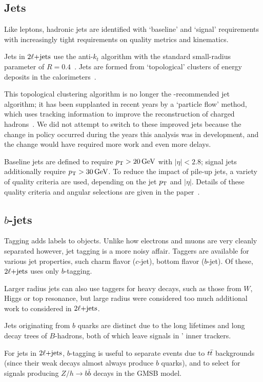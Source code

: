 \subsection{Jets}
Like leptons, hadronic jets are identified with `baseline' and `signal'
requirements with increasingly tight requirements on quality metrics and
kinematics.

Jets in $\twoljets$ use the anti-$k_t$ algorithm with the standard small-radius
parameter of $R=0.4$~\cite{jet_anti_kt}.
Jets are formed from `topological' clusters of energy deposits in the
calorimeters~\cite{atlas_jet_topo_PERF_2014_07}.

This topological clustering algorithm is no longer the \atlas-recommended jet
algorithm; it has been supplanted in recent years by a `particle flow' method,
which uses tracking information to improve the reconstruction of charged
hadrons~\cite{atlas_jet_pflow_PERF_2015_09}.
We did not attempt to switch to these improved jets because the change in
policy occurred during the years this analysis was in development, and the
change would have required more work and even more delays.

Baseline jets are defined to require $\pt > 20\,\eV[G]$ with $|\eta| < 2.8$;
signal jets additionally require $\pt > 30\,\eV[G]$.
To reduce the impact of pile-up jets, a variety of quality criteria are used,
depending on the jet $\pt$ and $|\eta|$.
Details of these quality criteria and angular selections are given in the
paper~\cite{atlas2022searches}.


\subsection{$b$-jets}
\label{sec:2ljets_btagging}
Tagging adds labels to objects.
Unlike how electrons and muons are very cleanly separated however, jet tagging
is a more noisy affair.
Taggers are available for various jet properties, such charm flavor ($c$-jet),
bottom flavor ($b$-jet).
Of these, $\twoljets$ uses only $b$-tagging.

Larger radius jets can also use taggers for heavy decays, such as those from
$W$, Higgs or top resonance, but large radius were considered too much
additional work to considered in $\twoljets$.

Jets originating from $b$ quarks are distinct due to the long lifetimes and
long decay trees of $B$-hadrons, both of which leave signals in \atlas'
inner trackers.

For jets in $\twoljets$, $b$-tagging is useful to separate events due to
$\ttbar$ backgrounds (since their weak decays almost always produce $b$
quarks), and to select for signals producing $Z/h \rightarrow b\bar b$ decays
in the GMSB model.

